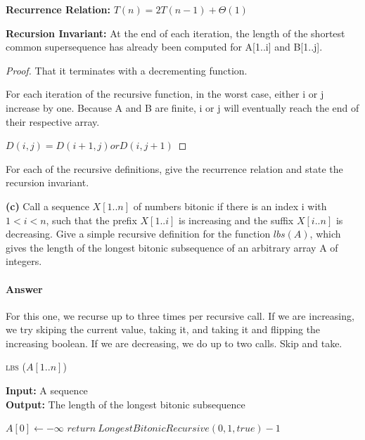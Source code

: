\documentclass{article}
\begin{document}
{\bf Recurrence Relation: } $T(n) = 2T(n-1) + \Theta(1)$

{\bf Recursion Invariant:} At the end of each iteration, the length of the shortest common supersequence has already been computed for A[1..i] and B[1..j].

\begin{proof}
    That it terminates with a decrementing function.

    For each iteration of the recursive function, in the worst case, either i or j increase by one. Because A and B are finite,
    i or j will eventually reach the end of their respective array.

    $D(i,j) = D(i+1,j) or D(i,j+1)$
\end{proof}



For each of the recursive definitions, give the recurrence
relation and state the recursion invariant.

{\bf (c)} Call a sequence $X[1.. n]$ of numbers bitonic if there is an index i with
$1 < i < n$, such that the prefix $X[1.. i]$ is increasing and the suffix
$X[i .. n]$ is decreasing. Give a simple recursive definition for the function
$lbs(A)$, which gives the length of the longest bitonic subsequence of an
arbitrary array A of integers.

\paragraph{Answer}

For this one, we recurse up to three times per recursive call. If we are increasing, we try
skiping the current value, taking it, and taking it and flipping the increasing boolean.
If we are decreasing, we do up to two calls. Skip and take.

\begin{algorithm} \caption{\textsc{lbs} ($A[1..n]$)}\label{alg:seb}
    {\bf Input:} A sequence\\
    {\bf Output:} The length of the longest bitonic subsequence
    \begin{algorithmic}[1]
        \State$A[0] \gets -\infty$
        \State$return\ LongestBitonicRecursive(0, 1, true) -1$
    \end{algorithmic}
\end{algorithm}
\end{document}
